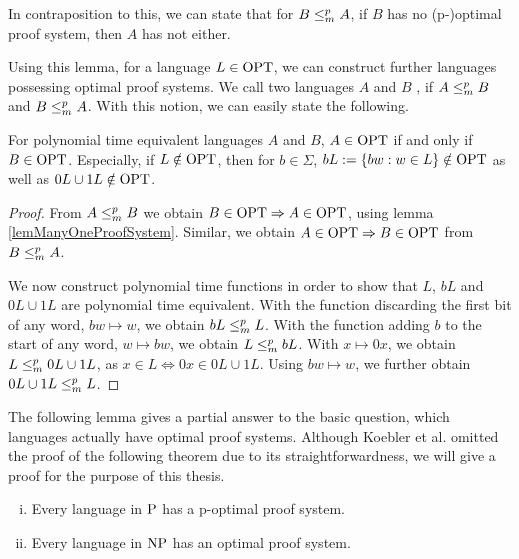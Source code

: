   In contraposition to this, we can state that for \(B \redmany A\), if \(B\) has no (p-)optimal proof system, then \(A\) has not either.
  
  Using this lemma, for a language \(L \in \OPT\), we can construct further languages possessing optimal proof systems. We call two languages \(A\) and \(B\) , if \(A \redmany B\) and \(B \redmany A\). With this notion, we can easily state the following.
  
  \begin{corollary} \label{corFurtherOPT}
    For polynomial time equivalent languages \(A\) and \(B\), \(A \in \OPT\) if and only if \(B \in \OPT\). Especially, if \(L \notin \OPT\), then for \(b \in \Sigma\), \(bL := \{ bw : w \in L \} \notin \OPT\) as well as \(0L \cup 1L \notin \OPT\).
  \end{corollary}
  
  \begin{proof}
    From \(A \redmany B\) we obtain \(B \in \OPT \Rightarrow A \in \OPT\), using lemma \ref{lemManyOneProofSystem}. Similar, we obtain \(A \in \OPT \Rightarrow B \in \OPT\) from \(B \redmany A\).
    
    We now construct polynomial time functions in order to show that \(L\), \(bL\) and \(0L \cup 1L\) are polynomial time equivalent. With the function discarding the first bit of any word, \(bw \mapsto w\), we obtain \(bL \redmany L\). With the function adding \(b\) to the start of any word, \(w \mapsto bw\), we obtain \(L \redmany bL\). With \(x \mapsto 0x\), we obtain \(L \redmany 0L \cup 1L\), as \(x \in L \Leftrightarrow 0x \in 0L \cup 1L\). Using \(bw \mapsto w\), we further obtain \(0L \cup 1L \redmany L\).
  \end{proof}

  The following lemma gives a partial answer to the basic question, which languages actually have optimal proof systems. Although Koebler et al. omitted the proof of the following theorem due to its straightforwardness, we will give a proof for the purpose of this thesis.

  \begin{lemma} \label{lemPHasOptimalProofSystem}
   \begin{enumerate}[(i)]
    \item Every language in \(\P\) has a p-optimal proof system.
    \item Every language in \(\NP\) has an optimal proof system.
   \end{enumerate}
  \end{lemma}

